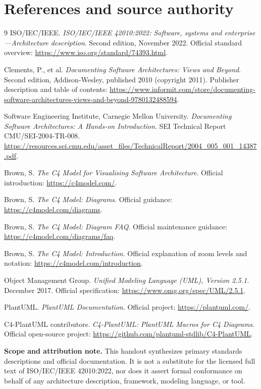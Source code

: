 \documentclass[11pt,letterpaper,oneside]{article}
\begin{document}
\section{References and source authority}\label{sec:references}
\begin{thebibliography}{9}
\setlength{\itemsep}{7pt}
 ISO/IEC/IEEE. \emph{ISO/IEC/IEEE 42010:2022: Software, systems and enterprise---Architecture description}. Second edition, November 2022. Official standard overview: \url{https://www.iso.org/standard/74393.html}.

 Clements, P., et al. \emph{Documenting Software Architectures: Views and Beyond}. Second edition, Addison-Wesley, published 2010 (copyright 2011). Publisher description and table of contents: \url{https://www.informit.com/store/documenting-software-architectures-views-and-beyond-9780132488594}.

 Software Engineering Institute, Carnegie Mellon University. \emph{Documenting Software Architectures: A Hands-on Introduction}. SEI Technical Report CMU/SEI-2004-TR-008. \url{https://resources.sei.cmu.edu/asset_files/TechnicalReport/2004_005_001_14387.pdf}.

 Brown, S. \emph{The C4 Model for Visualising Software Architecture}. Official introduction: \url{https://c4model.com/}.

 Brown, S. \emph{The C4 Model: Diagrams}. Official guidance: \url{https://c4model.com/diagrams}.

 Brown, S. \emph{The C4 Model: Diagram FAQ}. Official maintenance guidance: \url{https://c4model.com/diagrams/faq}.

 Brown, S. \emph{The C4 Model: Introduction}. Official explanation of zoom levels and notation: \url{https://c4model.com/introduction}.

 Object Management Group. \emph{Unified Modeling Language (UML), Version 2.5.1}. December 2017. Official specification: \url{https://www.omg.org/spec/UML/2.5.1}.

 PlantUML. \emph{PlantUML Documentation}. Official project: \url{https://plantuml.com/}.

 C4-PlantUML contributors. \emph{C4-PlantUML: PlantUML Macros for C4 Diagrams}. Official open-source project: \url{https://github.com/plantuml-stdlib/C4-PlantUML}.
\end{thebibliography}

\vspace{0.16in}
\begin{notebox}
\small\textbf{Scope and attribution note.} This handout synthesizes primary standards descriptions and official documentation. It is not a substitute for the licensed full text of ISO/IEC/IEEE 42010:2022, nor does it assert formal conformance on behalf of any architecture description, framework, modeling language, or tool.
\end{notebox}
\end{document}
